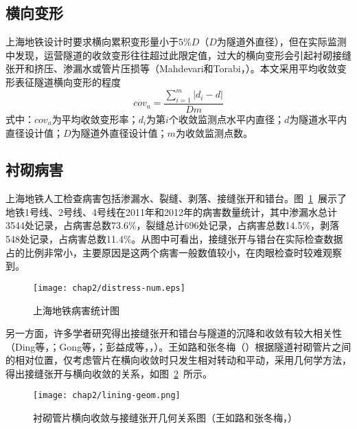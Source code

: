\subsection{横向变形}

上海地铁设计时要求横向累积变形量小于$5\%D$（$D$为隧道外直径），但在实际监测中发现，运营隧道的收敛变形往往超过此限定值，过大的横向变形会引起衬砌接缝张开和挤压、渗漏水或管片压损等（Mahdevari和Torabi，\citeyear{mahdevari2012prediction}）。本文采用平均收敛变形表征隧道横向变形的程度
\begin{equation}
    \label{equ:conv_ave}
    {{cov}_{a}}=\frac{\sum\limits_{i=1}^{m}{\left| {{d}_{i}}-d \right|}}{Dm}
\end{equation}
式中：${cov}_{a}$为平均收敛变形率；${d}_{i}$为第$i$个收敛监测点水平内直径；$d$为隧道水平内直径设计值；$D$为隧道外直径设计值；$m$为收敛监测点数。

\subsection{衬砌病害}

上海地铁人工检查病害包括渗漏水、裂缝、剥落、接缝张开和错台。图~\ref{fig:上海地铁病害统计图}~展示了地铁1号线、2号线、4号线在2011年和2012年的病害数量统计，其中渗漏水总计3544处记录，占病害总数73.6\%，裂缝总计696处记录，占病害总数14.5\%，剥落548处记录，占病害总数11.4\%。从图中可看出，接缝张开与错台在实际检查数据占的比例非常小，主要原因是这两个病害一般数值较小，在肉眼检查时较难观察到。

\begin{figure}[htbp]
    \centering
    \texttt{[image: chap2/distress-num.eps]}
    \caption{上海地铁病害统计图}
    \label{fig:上海地铁病害统计图}
\end{figure}

另一方面，许多学者研究得出接缝张开和错台与隧道的沉降和收敛有较大相关性（Ding等，\citeyear{ding2013full}；Gong等，\citeyear{gong2017comparison}；彭益成等，\citeyear{彭益成2013盾构隧道衬砌结构的壳}，）。王如路和张冬梅（\citeyear{王如路2013超载作用下软土盾构隧道横向变形机理及控制指标研究}）根据隧道衬砌管片之间的相对位置，仅考虑管片在横向收敛时只发生相对转动和平动，采用几何学方法，得出接缝张开与横向收敛的关系，如图~\ref{fig:衬砌管片横向收敛与接缝张开几何关系图}~所示。

\begin{figure}[htbp]
    \centering
    \texttt{[image: chap2/lining-geom.png]}
    \caption{衬砌管片横向收敛与接缝张开几何关系图（王如路和张冬梅，\citeyear{王如路2013超载作用下软土盾构隧道横向变形机理及控制指标研究}）}
    \label{fig:衬砌管片横向收敛与接缝张开几何关系图}
\end{figure}

